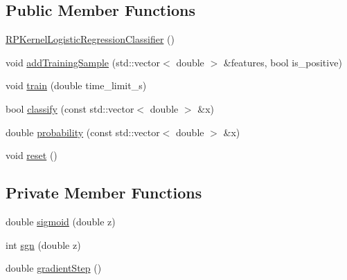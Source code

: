 \subsection*{\-Public \-Member \-Functions}
\begin{DoxyCompactItemize}
\item 
\hyperlink{class_r_p_kernel_logistic_regression_classifier_adfefd03cb8914d0223eab1d874d01966}{\-R\-P\-Kernel\-Logistic\-Regression\-Classifier} ()
\item 
void \hyperlink{class_r_p_kernel_logistic_regression_classifier_a76e06607099d33da606753c347dab738}{add\-Training\-Sample} (std\-::vector$<$ double $>$ \&features, bool is\-\_\-positive)
\item 
void \hyperlink{class_r_p_kernel_logistic_regression_classifier_a1e14b7daeb2fb65768c991b8d8837245}{train} (double time\-\_\-limit\-\_\-s)
\item 
bool \hyperlink{class_r_p_kernel_logistic_regression_classifier_aba1607052f771fe0951842a07b0ab2f4}{classify} (const std\-::vector$<$ double $>$ \&x)
\item 
double \hyperlink{class_r_p_kernel_logistic_regression_classifier_ad0e48344b6b6f4385752e55b51e98f4e}{probability} (const std\-::vector$<$ double $>$ \&x)
\item 
void \hyperlink{class_r_p_kernel_logistic_regression_classifier_a5bed4779fa0d28fca1d06627293d3070}{reset} ()
\end{DoxyCompactItemize}
\subsection*{\-Private \-Member \-Functions}
\begin{DoxyCompactItemize}
\item 
double \hyperlink{class_r_p_kernel_logistic_regression_classifier_aebdb3d0fd4689a5bfbd5cdb14ff6a0bb}{sigmoid} (double z)
\item 
int \hyperlink{class_r_p_kernel_logistic_regression_classifier_a60ad808101bb5de47f531158aa97cd6b}{sgn} (double z)
\item 
double \hyperlink{class_r_p_kernel_logistic_regression_classifier_a705f8e34ac01d78f9e7d5b9f323548ad}{gradient\-Step} ()
\end{DoxyCompactItemize}
